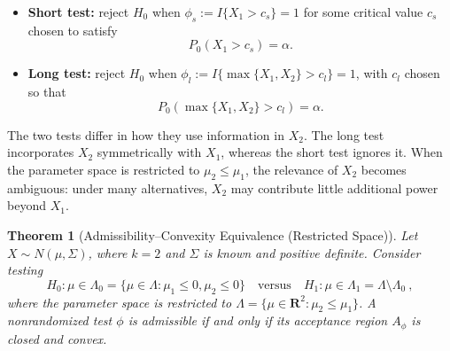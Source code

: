 \documentclass[12pt]{article}
\newtheorem{theorem}{Theorem}
\theoremstyle{definition}
\theoremstyle{remark}
\begin{document}
\begin{itemize}
    \item \textbf{Short test:} reject $H_0$ when $\phi_{s} := I\{X_1 > c_s\}=1$ for some critical value $c_s$ chosen to satisfy
    \[
    P_{0}(X_1 > c_s) = \alpha.
    \]

    \item \textbf{Long test:} reject $H_0$ when $\phi_{l} :=I\{\max\{X_1, X_2\} > c_l\}=1$, with $c_l$ chosen so that
    \[
    P_{0}(\max\{X_1, X_2\} > c_l) = \alpha.
    \]
\end{itemize}

The two tests differ in how they use information in $X_2$.  The long test incorporates $X_2$ symmetrically with $X_1$, whereas the short test ignores it.  When the parameter space is restricted to $\mu_2 \le \mu_1$, the relevance of $X_2$ becomes ambiguous: under many alternatives, $X_2$ may contribute little additional power beyond $X_1$.  

\begin{theorem}[Admissibility–Convexity Equivalence (Restricted Space)]
\label{thm:restricted-admissibility-convexity}
Let $X \sim N(\mu,\Sigma)$, where $k=2$ and $\Sigma$ is known and positive definite.
Consider testing 
$$ H_0 : \mu \in \Lambda_0 = \{\mu \in \Lambda : \mu_1 \le 0, \mu_2 \le 0\} \quad \text{versus}\quad  H_1 : \mu \in \Lambda_1 = \Lambda \setminus \Lambda_0~,$$ 
where the parameter space is restricted to $\Lambda = \{\mu \in \mathbf{R}^2 : \mu_2 \le \mu_1\}$.
A nonrandomized test $\phi$ is admissible if and only if its acceptance region $A_\phi$ is closed and convex.
\end{theorem}
\end{document}
